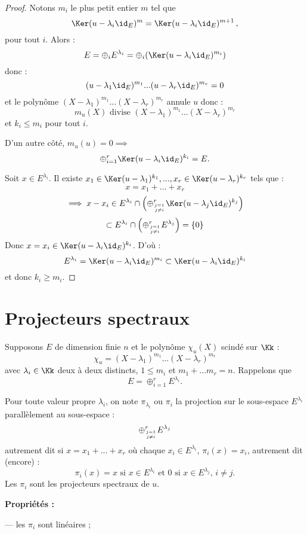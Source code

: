 \documentclass[class=report,crop=false]{standalone}
\begin{document}
\begin{proof}
Notons $m_i$ le plus petit entier $m$ tel que \[\Ker (u-\lambda_i\id_E)^{m} = \Ker (u-\lambda_i\id_E)^{m+1}\,,\]  pour tout $i$. Alors :
\[E = \oplus_i E^{\lambda_i} = \oplus_i (\Ker (u-\lambda_i\id_E)^{m_i})\]
donc : \[(u-\lambda_1\id_E)^{m_1}...(u-\lambda_r\id_E)^{m_r} = 0\]
et le polynôme $(X-\lambda_1)^{m_1}...(X-\lambda_r)^{m_r}$ annule $u$ donc :
\[m_u(X) \mbox{ divise }(X-\lambda_1)^{m_1}...(X-\lambda_r)^{m_r} \]
et $k_i \le m_i$ pour tout $i$.

D'un autre côté, $m_u(u)=0 \implies$
\[\oplus_{i=1}^r \Ker (u-\lambda_i\id_E)^{k_i} =E.\]

Soit $x \in E^{\lambda_i}$. Il existe $x_1 \in \Ker (u-\lambda_1)^{k_1},..., x_r \in \Ker(u-\lambda_r)^{k_r}$ tels que :
\[x = x_1 +... + x_r\]
\[\implies x-x_i \in E^{\lambda_i} \cap \left(\oplus_{j=1\atop j \neq i}^r \Ker (u-\lambda_j\id_E)^{k_j}\right)\]
\[\subset E^{\lambda_i} \cap \left(\oplus_{j=1\atop j \neq i}^r E^{\lambda_j} \right)= \{0\}\] 
Donc $x = x_i \in \Ker (u-\lambda_i\id_E)^{k_i}$. D'où : \[E^{\lambda_i} =\Ker (u-\lambda_i\id_E)^{m_i} \subset \Ker (u-\lambda_i\id_E)^{k_i}\]
et donc $k_i \ge m_i$.
\end{proof}


\section{Projecteurs spectraux}

Supposons $E$ de dimension finie $n$ et le polynôme $\chi_u(X)$ scindé sur $\Kk$ :
$$\chi_u = (X-\lambda_1)^{m_1}...(X-\lambda_r)^{m_r}$$
avec $\lambda_i\in \Kk$ deux à deux distincts, $1 \le m_i$ et $m_1+...m_r=n$.
Rappelons que \[E= \oplus_{i=1}^r E^{\lambda_i}.\]
\begin{definition}
Pour toute valeur propre $\lambda_i$, on note $\pi_{\lambda_i}$ ou $\pi_i$ la projection sur le sous-espace $E^{\lambda_i}$ parallèlement au sous-espace :
\[\oplus_{j=1\atop j\neq i}^r E^{\lambda_j}\]
autrement dit si $x= x_1+...+x_r$ où chaque $x_i \in E^{\lambda_i}$, $\pi_i(x) = x_i$, autrement dit (encore) :
\[\pi_i(x) = x \mbox{ si $x \in E^{\lambda_i}$ et 0 si $x \in E^{\lambda_j}$, $i \neq j$.
}\]
Les $\pi_i$ sont les projecteurs spectraux de $u$.

\end{definition}

{\bf Propriétés :} 

--- les $\pi_i$ sont linéaires ;
\end{document}
